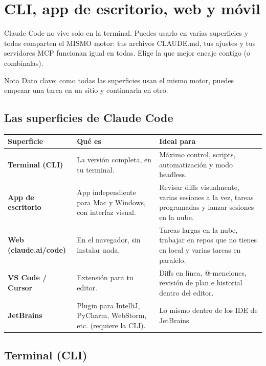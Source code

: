 \documentclass[11pt,a4paper]{report}
\begin{document}
\chapter{CLI, app de escritorio, web y móvil}

Claude Code no vive solo en la terminal. Puedes usarlo en varias superficies y todas comparten el MISMO motor: tus archivos CLAUDE.md, tus ajustes y tus servidores MCP funcionan igual en todas. Elige la que mejor encaje contigo (o combínalas).

\begin{calloutbox}{Nota}
Dato clave: como todas las superficies usan el mismo motor, puedes empezar una tarea en un sitio y continuarla en otro.\end{calloutbox}

\section{Las superficies de Claude Code}

\begin{longtable}{>{\raggedright\arraybackslash}p{}>{\raggedright\arraybackslash}p{}>{\raggedright\arraybackslash}p{}}
\toprule
Superficie & Qué es & Ideal para \\\midrule
\textbf{Terminal (CLI)} & La versión completa, en tu terminal. & Máximo control, scripts, automatización y modo headless. \\
\textbf{App de escritorio} & App independiente para Mac y Windows, con interfaz visual. & Revisar diffs visualmente, varias sesiones a la vez, tareas programadas y lanzar sesiones en la nube. \\
\textbf{Web (claude.ai/code)} & En el navegador, sin instalar nada. & Tareas largas en la nube, trabajar en repos que no tienes en local y varias tareas en paralelo. \\
\textbf{VS Code / Cursor} & Extensión para tu editor. & Diffs en línea, @-menciones, revisión de plan e historial dentro del editor. \\
\textbf{JetBrains} & Plugin para IntelliJ, PyCharm, WebStorm, etc. (requiere la CLI). & Lo mismo dentro de los IDE de JetBrains. \\
\bottomrule
\end{longtable}

\section{ Terminal (CLI)}
\end{document}
